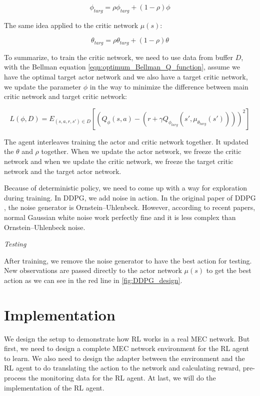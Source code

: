 \documentclass[conference]{IEEEtran}
\begin{document}
\begin{equation}
    \phi_{targ} = \rho \phi_{targ}  + (1- \rho) \phi
\end{equation}

The same idea applied to the critic network $\mu(s)$: 

\begin{equation}
    \theta_{targ} = \rho \theta_{targ}  + (1- \rho) \theta
\end{equation}

To summarize, to train the critic network, we need to use data from buffer $D$, with the Bellman equation \ref{eqn:optimum_Bellman_Q_function}, assume we have the optimal target actor network and we also have a target critic network, we update the parameter $\phi$ in the way to minimize the difference between main critic network and target critic network:

\begin{equation}
    L(\phi, D) = E_{(s,a,r,s') \in D}  [(Q_\phi(s,a) - (r + \gamma Q_{\phi_{targ}} (s',\mu_{\theta_{targ}}(s'))))^2]   
\end{equation}

The agent interleaves training the actor and critic network together. It updated the $\theta$ and $\rho$ together. When we update the actor network, we freeze the critic network and when we update the critic network, we freeze the target critic network and the target actor network. 

Because of deterministic policy, we need to come up with a way for exploration during training. In DDPG, we add noise in action. In the original paper of DDPG \cite{Lillicrap2016}, the noise generator is Ornstein–Uhlenbeck. However, according to recent papers, normal Gaussian white noise work perfectly fine and it is less complex than Ornstein–Uhlenbeck noise. 

\textit{Testing}

After training, we remove the noise generator to have the best action for testing. New observations are passed directly to the actor network $\mu(s)$ to get the best action as we can see in the red line in \ref{fig:DDPG_design}.


\section{Implementation}
\label{sec:Implementation}
We design the setup to demonstrate how RL works in a real MEC network. But first, we need to design a complete MEC network environment for the RL agent to learn. We also need to design the adapter between the environment and the RL agent to do translating the action to the network and calculating reward, pre-process the monitoring data for the RL agent. At last, we will do the implementation of the RL agent.
\end{document}
